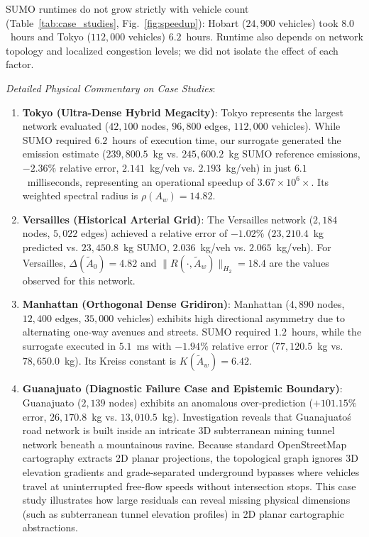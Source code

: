 \documentclass[journal]{IEEEtran}
\begin{document}
SUMO runtimes do not grow strictly with vehicle count (Table~\ref{tab:case_studies}, Fig.~\ref{fig:speedup}): Hobart ($24,900$ vehicles) took $8.0$~hours and Tokyo ($112,000$ vehicles) $6.2$~hours. Runtime also depends on network topology and localized congestion levels; we did not isolate the effect of each factor.

\textit{Detailed Physical Commentary on Case Studies}:
\begin{enumerate}
    \item \textbf{Tokyo (Ultra-Dense Hybrid Megacity)}: Tokyo represents the largest network evaluated ($42,100$ nodes, $96,800$ edges, $112,000$ vehicles). While SUMO required $6.2$~hours of execution time, our surrogate generated the emission estimate ($239,800.5$~kg vs. $245,600.2$~kg SUMO reference emissions, $-2.36\%$ relative error, $2.141$~kg/veh vs. $2.193$~kg/veh) in just $6.1$~milliseconds, representing an operational speedup of $3.67 \times 10^6 \times$. Its weighted spectral radius is $\rho(A_w) = 14.82$.
    
    \item \textbf{Versailles (Historical Arterial Grid)}: The Versailles network ($2,184$ nodes, $5,022$ edges) achieved a relative error of $-1.02\%$ ($23,210.4$~kg predicted vs. $23,450.8$~kg SUMO, $2.036$~kg/veh vs. $2.065$~kg/veh). For Versailles, $\Delta(\tilde{A}_0) = 4.82$ and $\|R(\cdot, \tilde{A}_w)\|_{H_2} = 18.4$ are the values observed for this network.
    
    \item \textbf{Manhattan (Orthogonal Dense Gridiron)}: Manhattan ($4,890$ nodes, $12,400$ edges, $35,000$ vehicles) exhibits high directional asymmetry due to alternating one-way avenues and streets. SUMO required $1.2$~hours, while the surrogate executed in $5.1$~ms with $-1.94\%$ relative error ($77,120.5$~kg vs. $78,650.0$~kg). Its Kreiss constant is $K(\tilde{A}_w) = 6.42$.
    
    \item \textbf{Guanajuato (Diagnostic Failure Case and Epistemic Boundary)}: Guanajuato ($2,139$ nodes) exhibits an anomalous over-prediction ($+101.15\%$ error, $26,170.8$~kg vs. $13,010.5$~kg). Investigation reveals that Guanajuato\'s road network is built inside an intricate 3D subterranean mining tunnel network beneath a mountainous ravine. Because standard OpenStreetMap cartography extracts 2D planar projections, the topological graph ignores 3D elevation gradients and grade-separated underground bypasses where vehicles travel at uninterrupted free-flow speeds without intersection stops. This case study illustrates how large residuals can reveal missing physical dimensions (such as subterranean tunnel elevation profiles) in 2D planar cartographic abstractions.
\end{enumerate}
\end{document}
